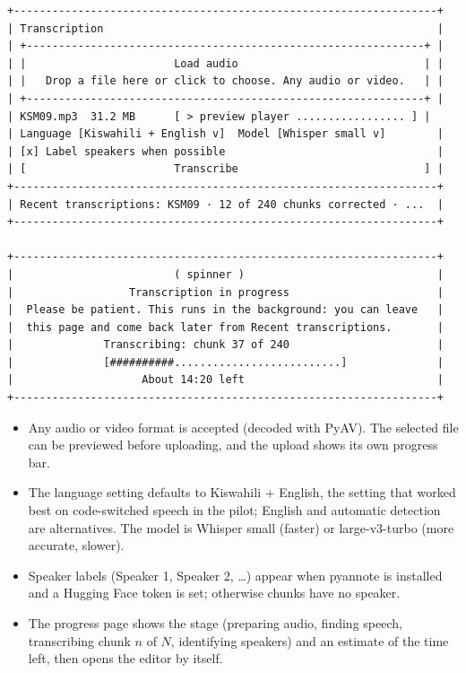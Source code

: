 \documentclass[11pt]{article}
\begin{document}
\begin{lstlisting}
+------------------------------------------------------------------+
| Transcription                                                    |
| +--------------------------------------------------------------+ |
| |                       Load audio                             | |
| |   Drop a file here or click to choose. Any audio or video.   | |
| +--------------------------------------------------------------+ |
| KSM09.mp3  31.2 MB      [ > preview player ................. ] |
| Language [Kiswahili + English v]  Model [Whisper small v]        |
| [x] Label speakers when possible                                 |
| [                       Transcribe                             ] |
+------------------------------------------------------------------+
| Recent transcriptions: KSM09 · 12 of 240 chunks corrected · ...  |
+------------------------------------------------------------------+

+------------------------------------------------------------------+
|                         ( spinner )                              |
|                  Transcription in progress                       |
|  Please be patient. This runs in the background: you can leave   |
|  this page and come back later from Recent transcriptions.       |
|              Transcribing: chunk 37 of 240                       |
|              [##########..........................]              |
|                    About 14:20 left                              |
+------------------------------------------------------------------+
\end{lstlisting}

\begin{itemize}
\tightlist
\item
  Any audio or video format is accepted (decoded with PyAV). The selected file can be previewed before uploading, and the upload shows its own progress bar.
\item
  The language setting defaults to Kiswahili + English, the setting that worked best on code-switched speech in the pilot; English and automatic detection are alternatives. The model is Whisper small (faster) or large-v3-turbo (more accurate, slower).
\item
  Speaker labels (Speaker 1, Speaker 2, \ldots) appear when pyannote is installed and a Hugging Face token is set; otherwise chunks have no speaker.
\item
  The progress page shows the stage (preparing audio, finding speech, transcribing chunk $n$ of $N$, identifying speakers) and an estimate of the time left, then opens the editor by itself.
\end{itemize}
\end{document}
